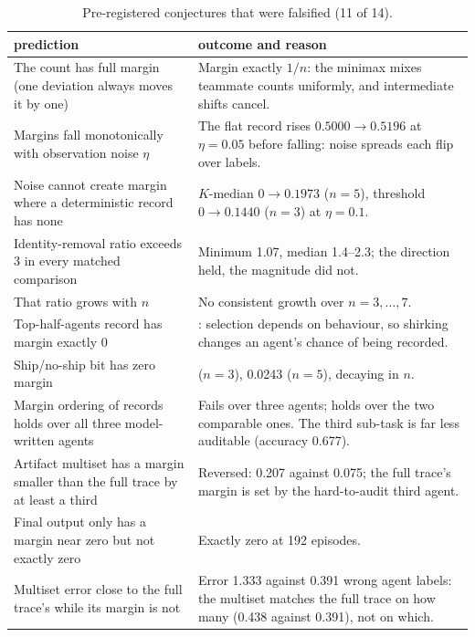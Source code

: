 \documentclass[sigconf,anonymous,acmthm=false]{aamas}
\theoremstyle{acmplain}
\theoremstyle{acmdefinition}
\begin{document}
\begin{table}[t]
\caption{Pre-registered conjectures that were falsified (11 of 14).}
\label{tab:prereg}
\footnotesize
\begin{tabularx}{\textwidth}{@{}>{\raggedright\arraybackslash}p{70mm}>{\raggedright\arraybackslash}X@{}}
\toprule
prediction & outcome and reason\\
\midrule
The count has full margin (one deviation always moves it by one) & Margin exactly $1/n$: the minimax mixes teammate counts uniformly, and intermediate shifts cancel.\\
Margins fall monotonically with observation noise $\eta$ & The flat record rises $0.5000\to0.5196$ at $\eta=0.05$ before falling: noise spreads each flip over labels.\\
Noise cannot create margin where a deterministic record has none & $K$-median $0\to0.1973$ ($n=5$), threshold $0\to0.1440$ ($n=3$) at $\eta=0.1$.\\
Identity-removal ratio exceeds 3 in every matched comparison & Minimum 1.07, median 1.4--2.3; the direction held, the magnitude did not.\\
That ratio grows with $n$ & No consistent growth over $n=3,\dots,7$.\\
Top-half-agents record has margin exactly 0 & 0.2624: selection depends on behaviour, so shirking changes an agent's chance of being recorded.\\
Ship/no-ship bit has zero margin & 0.0900 ($n=3$), 0.0243 ($n=5$), decaying in $n$.\\
Margin ordering of records holds over all three model-written agents & Fails over three agents; holds over the two comparable ones. The third sub-task is far less auditable (accuracy 0.677).\\
Artifact multiset has a margin smaller than the full trace by at least a third & Reversed: 0.207 against 0.075; the full trace's margin is set by the hard-to-audit third agent.\\
Final output only has a margin near zero but not exactly zero & Exactly zero at 192 episodes.\\
Multiset error close to the full trace's while its margin is not & Error 1.333 against 0.391 wrong agent labels: the multiset matches the full trace on how many (0.438 against 0.391), not on which.\\
\bottomrule
\end{tabularx}
\end{table}
\end{document}
